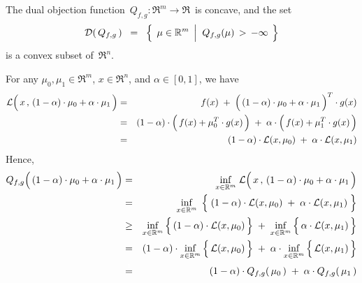 \vskip 1.0cm
\begin{theorem}
\mbox{}
\vskip 0.1cm
\noindent
The dual objection function \,$Q_{f,g} : \Re^{m} \longrightarrow \Re$\, is concave,
and the set
\begin{equation*}
\mathcal{D}(\,Q_{f,g}\,)
\;\; = \;\;
	\left\{\;\,
		\mu \in \Re^{m}
		\;\left\vert\;\;
		Q_{f,g}(\mu) \,\overset{{\color{white}.}}{>}\, -\infty
		\right.
		\;\right\}
\end{equation*}
is a convex subset of \,$\Re^{n}$.
\end{theorem}
\proof
For any $\mu_{0}, \mu_{1} \in \Re^{m}$, $x \in \Re^{n}$, and $\alpha \in [0,1]$, we have
\begin{eqnarray*}
\mathcal{L}\!\left(\,x\,,\,(1-\alpha)\cdot\mu_{0}\overset{{\color{white}.}}{+}\alpha\cdot\mu_{1}\,\right)
& = &
	f(x) \;+\; \left(\,(1-\alpha)\cdot\mu_{0}\overset{{\color{white}.}}{+}\alpha\cdot\mu_{1}\,\right)^{T} \cdot g(x)
\\
& = &
	(1-\alpha)\cdot
	\left(\,f(x) \overset{{\color{white}.}}{+} \mu_{0}^{T}\cdot g(x)\,\right)
	\;+\;
	\alpha\cdot
	\left(\,f(x) \overset{{\color{white}.}}{+}\mu_{1}^{T} \cdot g(x)\,\right)
\\
& = &
	(1-\alpha) \cdot \mathcal{L}(x,\mu_{0})
	\;+\;
	\alpha \cdot \mathcal{L}(x,\mu_{1})
\end{eqnarray*}
Hence,
\begin{eqnarray*}
Q_{f,g}\!\left(\,(1-\alpha)\cdot\mu_{0}\overset{{\color{white}.}}{+}\alpha\cdot\mu_{1}\,\right)
& = &
	\underset{x\in\Re^{m}}{\inf}\;
	\mathcal{L}\!\left(\,x\,,\,(1-\alpha)\cdot\mu_{0}\overset{{\color{white}.}}{+}\alpha\cdot\mu_{1}\,\right)
\\
& = &
	\underset{x\in\Re^{m}}{\inf}\;\left\{\;
		(1-\alpha) \cdot \mathcal{L}(x,\mu_{0})
		\;\overset{{\color{white}.}}{+}\;
		\alpha \cdot \mathcal{L}(x,\mu_{1})
		\;\right\}
\\
& \geq &
	\underset{x\in\Re^{m}}{\inf}\left\{\,
		(1-\alpha) \cdot
		\overset{{\color{white}.}}{\mathcal{L}(x,\mu_{0})}
		\,\right\}
	\; + \;
	\underset{x\in\Re^{m}}{\inf}\left\{\,
		\alpha \cdot
		\overset{{\color{white}.}}{\mathcal{L}(x,\mu_{1})}
		\,\right\}
\\
& = &
	(1-\alpha) \cdot
	\underset{x\in\Re^{m}}{\inf}\left\{\,
		\overset{{\color{white}.}}{\mathcal{L}(x,\mu_{0})}
		\,\right\}
	\; + \;
	\alpha \cdot
	\underset{x\in\Re^{m}}{\inf}\left\{\,
		\overset{{\color{white}.}}{\mathcal{L}(x,\mu_{1})}
		\,\right\}
\\
& \overset{{\color{white}1}}{=} &
	(1-\alpha) \cdot Q_{f,g}(\,\mu_{0}\,)
	\; + \;
	\alpha \cdot Q_{f,g}(\,\mu_{1}\,)
\end{eqnarray*}
